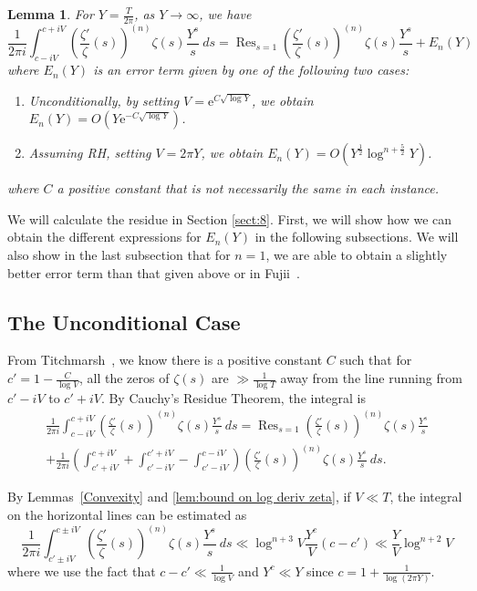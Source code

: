 \documentclass[12pt,a4paper,reqno]{amsart}
\DeclareMathOperator*{\Res}{Res}
\newtheorem{lemma}{Lemma}
\theoremstyle{remark}
\numberwithin{equation}{section}
\begin{document}
\begin{lemma}\label{ErrorLemma}
For $Y=\frac{T}{2\pi}$, as $Y\to\infty$, we have
\[
\frac{1}{2 \pi i } \int_{c- iV}^{c + iV}\left( \frac{\zeta'}{\zeta}(s) \right)^{(n)} \zeta(s) \frac{Y^s}{s} \ ds = \Res_{s=1} \left( \frac{\zeta'}{\zeta}(s) \right)^{(n)} \zeta(s) \frac{Y^s}{s} + E_n(Y)
\]
where $E_n(Y)$ is an error term given by one of the following two cases:
\begin{enumerate}
\item Unconditionally, by setting $V = \mathrm{e}^{C \sqrt{\log Y}}$, we obtain $E_n(Y) = O \left(Y \mathrm{e}^{-C \sqrt{\log Y}} \right)$.
\item Assuming RH, setting $V=2\pi Y$, we obtain $E_n(Y) = O \left( Y^{\frac{1}{2}} \log^{n+\frac{5}{2}} Y \right)$.
\end{enumerate}
where  $C$ a positive constant that is not necessarily the same in each instance.
\end{lemma}


We will calculate the residue in Section \ref{sect:8}. First, we will show how we can obtain the different expressions for $E_n(Y)$ in the following subsections. We will also show in the last subsection that for $n=1$, we are able to obtain a slightly better error term than that given above or in Fujii~\cite{FujiiShanks}.

\subsection{The Unconditional Case}
From Titchmarsh~\cite[Sect. 3.8, p. 54]{Titchmarsh}, we know there is a positive constant $C$ such that for $c' = 1 - \frac{C}{\log V}$, all the zeros of $\zeta(s)$ are $\gg\frac{1}{\log T}$ away from the line running from $c'-i V$ to $c'+ i V$. By Cauchy's Residue Theorem, the integral is
\begin{multline*}
    \frac{1}{2 \pi i } \int_{c- iV}^{c + iV} \left( \frac{\zeta'}{\zeta}(s) \right)^{(n)} \zeta(s) \frac{Y^s}{s} \ ds = \Res_{s=1} \left( \frac{\zeta'}{\zeta}(s) \right)^{(n)} \zeta(s) \frac{Y^s}{s} \\
    + \frac{1}{2 \pi i } \left(\int_{c' + iV}^{c + iV} + \int_{c' - iV}^{c' + iV} - \int_{c' - iV}^{c - iV} \right) \left( \frac{\zeta'}{\zeta}(s) \right)^{(n)} \zeta(s) \frac{Y^s}{s} \ ds.
\end{multline*}

By Lemmas~\ref{Convexity} and \ref{lem:bound on log deriv zeta}, if $V\ll T$, the integral on the horizontal lines can be estimated as
\begin{equation*}
    \frac{1}{2 \pi i } \int_{c' \pm iV}^{c \pm iV} \left( \frac{\zeta'}{\zeta}(s) \right)^{(n)} \zeta(s) \frac{Y^s}{s} \ ds \ll \log^{n+3} V \frac{Y^c}{V}(c-c') \ll \frac{Y}{V} \log^{n+2} V
\end{equation*}
where we use the fact that $c-c' \ll \frac{1}{\log V}$ and $Y^c \ll Y$ since $c=1+\frac{1}{\log(2\pi Y)}$.
\end{document}
